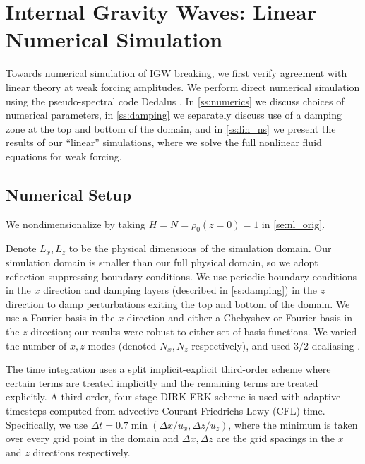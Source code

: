 \documentclass[
        fleqn,
        usenatbib,
    ]{mnras}
\begin{document}
\section{Internal Gravity Waves: Linear Numerical Simulation}\label{s:sim}

Towards numerical simulation of IGW breaking, we first verify agreement with
linear theory at weak forcing amplitudes. We perform direct numerical simulation
using the pseudo-spectral code Dedalus \citep{dedalus}. In \autoref{ss:numerics}
we discuss choices of numerical parameters, in \autoref{ss:damping} we
separately discuss use of a damping zone at the top and bottom of the domain,
and in \autoref{ss:lin_ns} we present the results of our ``linear'' simulations,
where we solve the full nonlinear fluid equations for weak forcing.

\subsection{Numerical Setup}\label{ss:numerics}

We nondimensionalize by taking $H = N = \rho_0(z=0) = 1$ in
\autoref{se:nl_orig}.

Denote $L_x, L_z$ to be the physical dimensions of the simulation domain. Our
simulation domain is smaller than our full physical domain, so we adopt
reflection-suppressing boundary conditions. We use periodic boundary conditions
in the $x$ direction and damping layers (described in \autoref{ss:damping}) in
the $z$ direction to damp perturbations exiting the top and bottom of the
domain. We use a Fourier basis in the $x$ direction and either a Chebyshev or
Fourier basis in the $z$ direction; our results were robust to either set of
basis functions. We varied the number of $x, z$ modes (denoted $N_x, N_z$
respectively), and used $3/2$ dealiasing \citep{boyd}.

The time integration uses a split implicit-explicit third-order scheme where
certain terms are treated implicitly and the remaining terms are treated
explicitly. A third-order, four-stage DIRK-ERK scheme \citep{ascher} is used
with adaptive timesteps computed from advective Courant-Friedrichs-Lewy (CFL)
time. Specifically, we use $\Delta t = 0.7 \min(\Delta x / u_x,\Delta z / u_z)$,
where the minimum is taken over every grid point in the domain and $\Delta
x,\Delta z$ are the grid spacings in the $x$ and $z$ directions respectively.
\end{document}
